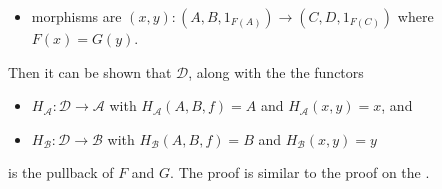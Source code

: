 \documentclass[12pt]{article}
\begin{document}
\begin{enumerate}
\begin{itemize}
\item morphisms are $(x,y):(A,B,1_{F(A)})\to (C,D,1_{F(C)})$ where $F(x)=G(y)$.
\end{itemize}
Then it can be shown that $\mathcal{D}$, along with the the functors 
\begin{itemize}
\item $H_{\mathcal{A}}: \mathcal{D}\to \mathcal{A}$ with $H_{\mathcal{A}}(A,B,f)=A$ and $H_{\mathcal{A}}(x,y)=x$, and \item $H_{\mathcal{B}}: \mathcal{D}\to \mathcal{B}$ with $H_{\mathcal{B}}(A,B,f)=B$ and $H_{\mathcal{B}}(x,y)=y$ 
\end{itemize}
is the pullback of $F$ and $G$.  The proof is similar to the proof on the .
\end{enumerate}
\end{document}
